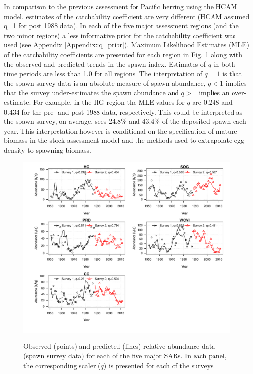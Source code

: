 In comparison to the previous assessment for Pacific herring using the HCAM model, estimates of the catchability coefficient are very different (HCAM assumed q=1 for post 1988 data).  In each of the five major assessment regions (and the two minor regions) a less informative prior for the catchability coefficient was used (see Appendix \ref{Appendix::q_prior}).  Maximum Likelihood Estimates (MLE) of the catchability coefficients are presented for each region in Fig. \ref{PartII:Results:fig3} along with the observed and predicted trends in the spawn index.  Estimates of $q$ in both time periods are less than 1.0 for all regions.  The interpretation of $q=1$ is that the spawn survey data is an absolute measure of spawn abundance, $q<1$ implies that the survey under-estimates the spawn abundance and $q>1$ implies an over-estimate.  For example, in the HG region the MLE values for $q$ are 0.248 and 0.434 for the pre- and post-1988 data, respectively. This could be interpreted as the spawn survey, on average, sees 24.8\% and 43.4\% of the deposited spawn each year.  This interpretation however is conditional on the specification of mature biomass in the stock assessment model and the methods used to extrapolate egg density to spawning biomass. 

\begin{figure}[!tbp]
	\includegraphics[width=\textwidth]{../FIGS/qPriorFigs/iscam_fig_surveyfit.pdf}\\
	\caption{Observed (points) and predicted (lines) relative abundance data (spawn survey data) for each of the five major SARs.  In each panel, the corresponding scaler ($q$) is presented for each of the surveys.}\label{PartII:Results:fig3}
\end{figure}


